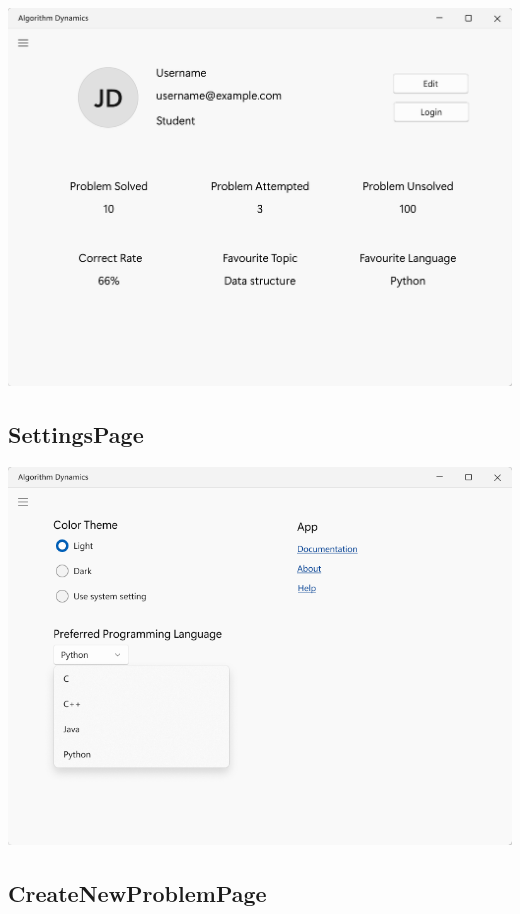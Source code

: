 \documentclass[a4paper]{report}
\begin{document}
\includegraphics[width=\textwidth, height=\textheight, keepaspectratio]{AccountPage-design}

\subsection{SettingsPage}

\includegraphics[width=\textwidth, height=\textheight, keepaspectratio]{SettingsPage-design}

\subsection{CreateNewProblemPage}
\end{document}
